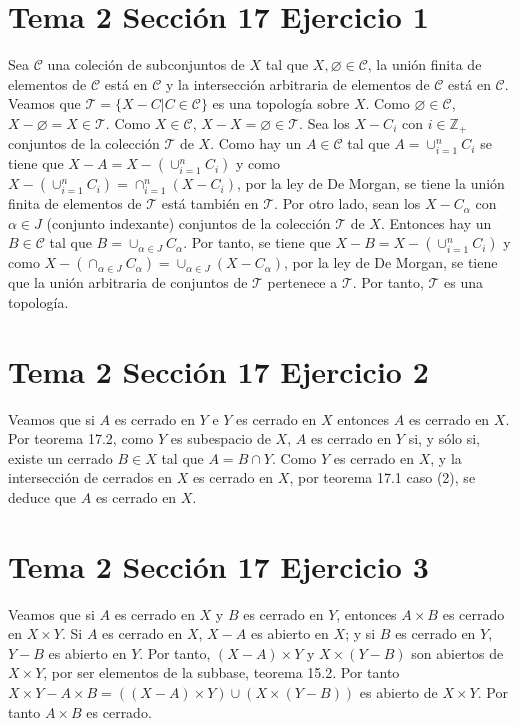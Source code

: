 \documentclass{article}
\begin{document}
\section{Tema 2 Sección 17 Ejercicio 1}
Sea $\mathcal{C}$ una coleción de subconjuntos de $X$ tal que $X,\varnothing\in \mathcal{C}$, la unión finita de elementos de $\mathcal{C}$ está en $\mathcal{C}$ y la intersección arbitraria de elementos de $\mathcal{C}$ está en $\mathcal{C}$. Veamos que $\mathcal{T}=\{X-C|C\in\mathcal{C}\}$ es una topología sobre $X$. Como $\varnothing\in \mathcal{C}$, $X-\varnothing=X\in \mathcal{T}$. Como $X\in \mathcal{C}$, $X-X=\varnothing\in \mathcal{T}$. Sea los $X-C_i$ con $i\in \mathbb{Z}_+$ conjuntos de la colección $\mathcal{T}$ de $X$. Como hay un $A\in \mathcal{C}$ tal que $A=\cup^n_{i=1}C_i$ se tiene que $X-A=X-(\cup^n_{i=1}C_i)$ y como $X-(\cup^n_{i=1}C_i)=\cap^n_{i=1}(X-C_i)$, por la ley de De Morgan, se tiene la unión finita de elementos de $\mathcal{T}$ está también en $\mathcal{T}$. Por otro lado, sean los $X-C_\alpha$ con $\alpha\in J$ (conjunto indexante) conjuntos de la colección $\mathcal{T}$ de $X$. Entonces hay un $B\in \mathcal{C}$ tal que $B=\cup_{\alpha\in J}C_\alpha$. Por tanto, se tiene que $X-B=X-(\cup^n_{i=1}C_i)$ y como $X-(\cap_{\alpha\in J}C_{\alpha})=\cup_{\alpha\in J}(X-C_\alpha)$, por la ley de De Morgan, se tiene que la unión arbitraria de conjuntos de $\mathcal{T}$ pertenece a $\mathcal{T}$. Por tanto, $\mathcal{T}$ es una topología.

\section{Tema 2 Sección 17 Ejercicio 2}
Veamos que si $A$ es cerrado en $Y$ e $Y$ es cerrado en $X$ entonces $A$ es cerrado en $X$.  Por teorema 17.2, como $Y$ es subespacio de $X$, $A$ es cerrado en $Y$ si, y sólo si, existe un cerrado $B\in X$ tal que $A=B\cap Y$. Como $Y$ es cerrado en $X$, y la intersección de cerrados en $X$ es cerrado en $X$, por teorema 17.1 caso (2), se deduce que $A$ es cerrado en $X$.

\section{Tema 2 Sección 17 Ejercicio 3}
Veamos que si $A$ es cerrado en $X$ y $B$ es cerrado en $Y$, entonces $A\times B$ es cerrado en $X\times Y$. Si $A$ es cerrado en $X$, $X-A$ es abierto en $X$; y si $B$ es cerrado en $Y$, $Y-B$ es abierto en $Y$. Por tanto, $(X-A)\times Y$ y $X\times(Y-B)$ son abiertos de $X\times Y$, por ser elementos de la subbase, teorema 15.2. Por tanto $X\times Y-A\times B=((X-A)\times Y)\cup (X\times(Y-B))$ es abierto de $X\times Y$. Por tanto $A\times B$ es cerrado.
\end{document}
